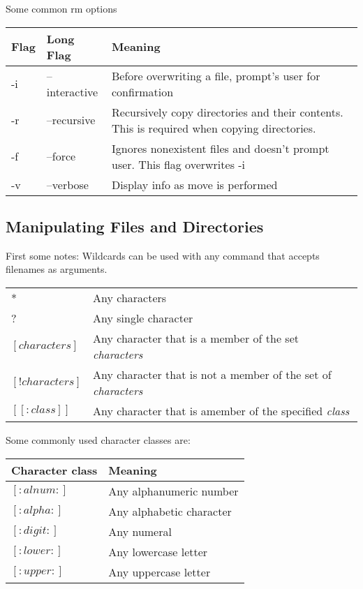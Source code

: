 \documentclass[12pt]{article}
\begin{document}
\vskip 0.15in
Some common rm options\newline
\noindent\begin{tabular}{|l|l|p{4in}|}
	\hline
	Flag & Long Flag & Meaning\\ \hline
	-i & --interactive & Before overwriting a file, prompt's user for confirmation\\
	-r & --recursive & Recursively copy directories and their contents. This is required when copying directories.\\
	-f & --force & Ignores nonexistent files and doesn't prompt user. This flag overwrites -i\\
	-v & --verbose & Display info as move is performed\\ \hline		
	
\end{tabular}
	

\newpage
\subsection{Manipulating Files and Directories}%

First some notes:\newline
Wildcards can be used with any command that accepts filenames as arguments.\newline

\noindent\begin{tabular}{|l|l|}
	\hline
	* & Any characters\\
	? & Any single character\\
	$[characters]$ & Any character that is a member of the set \textit{characters}\\
	$[!characters]$ & Any character that is not a member of the set of \textit{characters}\\
	$[[:class]]$ & Any character that is amember of the specified \textit{class}\\
	
	\hline

\end{tabular}

\vskip 0.5in

Some commonly used character classes are:\newline

\noindent\begin{tabular}{| l | p{4in} |}
	\hline
	Character class & Meaning\\ \hline
	$[:alnum:]$ & Any alphanumeric number\\
	$[:alpha:]$ & Any alphabetic character\\
	$[:digit:]$ & Any numeral\\
	$[:lower:]$ & Any lowercase letter\\
	$[:upper:]$ & Any uppercase letter\\ \hline
\end{tabular}
\end{document}
